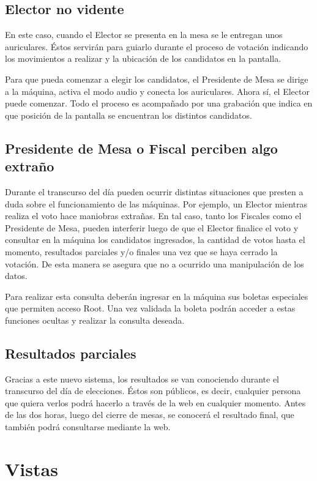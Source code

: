 \documentclass[spanish, 10pt,a4paper]{article}
\numberwithin{equation}{section} %
\begin{document}
\subsection{Elector no vidente}

	En este caso, cuando el Elector se presenta en la mesa se le entregan unos auriculares. Éstos servirán para guiarlo durante el proceso de votación indicando los movimientos a realizar y la ubicación de los candidatos en la pantalla.
	
	Para que pueda comenzar a elegir los candidatos, el Presidente de Mesa se dirige a la máquina, activa el modo audio y conecta los auriculares. Ahora sí, el Elector puede comenzar. Todo el proceso es acompañado por una grabación que indica en que posición de la pantalla se encuentran los distintos candidatos.
	
\subsection{Presidente de Mesa o Fiscal perciben algo extraño}
	Durante el transcurso del día pueden ocurrir distintas situaciones que presten a duda sobre el funcionamiento de las máquinas. Por ejemplo, un Elector mientras realiza el voto hace maniobras extrañas. En tal caso, tanto los Fiscales como el Presidente de Mesa, pueden interferir luego de que el Elector finalice el voto y consultar en la máquina los candidatos ingresados, la cantidad de votos hasta el momento, resultados parciales y/o finales una vez que se haya cerrado la votación. De esta manera se asegura que no a ocurrido una manipulación de los datos. 
	
	Para realizar esta consulta deberán ingresar en la máquina sus boletas especiales que permiten acceso Root. Una vez validada la boleta podrán acceder a estas funciones ocultas y realizar la consulta deseada. 

\subsection{Resultados parciales}
	Gracias a este nuevo sistema, los resultados se van conociendo durante el transcurso del día de elecciones. Éstos son públicos, es decir, cualquier persona que quiera verlos podrá hacerlo a través de la web en cualquier momento.
	Antes de las dos horas, luego del cierre de mesas, se conocerá el resultado final, que también podrá consultarse mediante la web. 

\section{Vistas}
\end{document}

